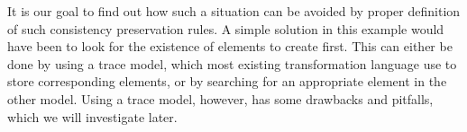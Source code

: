 It is our goal to find out how such a situation can be avoided by proper definition of such consistency preservation rules.
A simple solution in this example would have been to look for the existence of elements to create first.
This can either be done by using a trace model, which most existing transformation language use to store corresponding elements, or by searching for an appropriate element in the other model.
Using a trace model, however, has some drawbacks and pitfalls, which we will investigate later.






